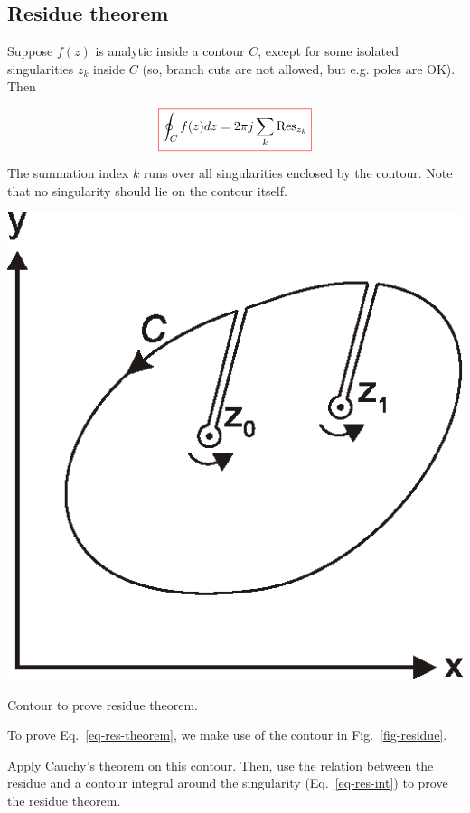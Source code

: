 \subsection*{Residue theorem}

Suppose $f(z)$ is analytic inside a contour ${C}$, except for some isolated singularities $z_k$ inside ${C}$ (so, branch cuts are not allowed, but e.g. poles are OK). Then

\begin{equation}
\fbox{$\displaystyle
\oint_{{C}} f(z) dz = 2 \pi j \sum_k \mathrm{Res}_{z_k} \label{eq-res-theorem}
$}
\end{equation} 

The summation index $k$ runs over all singularities enclosed by the contour. Note that no singularity should lie on the contour itself.

\begin{marginfigure}
\centering
\includegraphics{complex/figures/residue}
\caption{Contour to prove residue theorem.}
\label{fig-residue}
\end{marginfigure}

To prove Eq.~\ref{eq-res-theorem}, we make use of the contour in Fig.~\ref{fig-residue}.

\begin{cue}
  Apply Cauchy's theorem on this contour. Then, use the relation between the residue and a contour integral around the singularity (Eq.~\ref{eq-res-int}) to prove the residue theorem. 
\end{cue}

